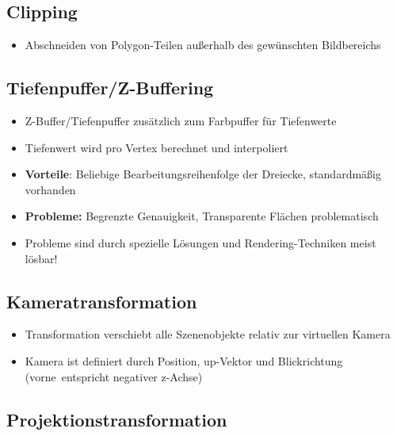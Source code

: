 \documentclass[10pt,a4paper]{article}
\begin{document}
	\subsection{Clipping}
	\label{sub:clipping}
	
	\begin{itemize}
		\item Abschneiden von Polygon-Teilen außerhalb des gewünschten Bildbereichs
	\end{itemize}

	\subsection{Tiefenpuffer/Z-Buffering}
	\label{sub:tiefenpuffer_z_buffering}
	
	\begin{itemize}
		\item Z-Buffer/Tiefenpuffer zusätzlich zum Farbpuffer für Tiefenwerte
		\item Tiefenwert wird pro Vertex berechnet und interpoliert
		\item \textbf{Vorteile}: Beliebige Bearbeitungsreihenfolge der Dreiecke, standardmäßig vorhanden
		\item \textbf{Probleme:} Begrenzte Genauigkeit, Transparente Flächen problematisch
		\item Probleme sind durch spezielle Lösungen und Rendering-Techniken meist lösbar!
	\end{itemize}

	\subsection{Kameratransformation}
	\label{sub:kameratransformation}
	
	\begin{itemize}
		\item Transformation verschiebt alle Szenenobjekte relativ zur virtuellen Kamera
		\item Kamera ist definiert durch Position, up-Vektor und Blickrichtung (\glqq vorne\grqq\ entspricht negativer z-Achse)
	\end{itemize}

	\subsection{Projektionstransformation}
	\label{sub:projektionstransformation}
	
\end{document}
